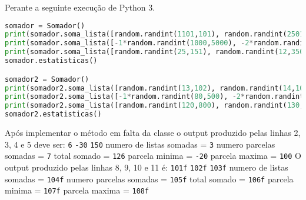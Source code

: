 \documentclass[12pt,varwidth=16cm,border=17pt]{standalone}
\begin{document}
Perante a seguinte execução de Python 3. 

\begin{lstlisting}[language=Python]
somador = Somador()
print(somador.soma_lista([random.randint(1101,101), random.randint(2501,200), random.randint(3350,300)]))
print(somador.soma_lista([-1*random.randint(1000,5000), -2*random.randint(2000, 8000)]))
print(somador.soma_lista([random.randint(25,151), random.randint(12,350)]))
somador.estatisticas()

somador2 = Somador()
print(somador2.soma_lista([random.randint(13,102), random.randint(14,103)]))
print(somador2.soma_lista([-1*random.randint(80,500), -2*random.randint(90, 600), -3*random.randint(110,700)]))
print(somador2.soma_lista([random.randint(120,800), random.randint(130,900), random.randint(140,1001), random.randint(160,1002)]))
somador2.estatisticas()
\end{lstlisting}


Após implementar o método em falta da classe o output produzido pelas linhas 2, 3, 4 e 5 deve ser:
\newline 
\verb+6+\newline
\verb+-30+\newline
\verb+150+\newline
numero de listas somadas = \verb+3+\newline
numero parcelas somadas  = \verb+7+\newline
total somado             = \verb+126+\newline
parcela minima           = \verb+-20+\newline
parcela maxima           = \verb+100+\newline
\newline
\newline
O output produzido pelas linhas 8, 9, 10 e 11 é:
\newline
\verb+101f+\newline
\verb+102f+\newline
\verb+103f+\newline
numero de listas somadas = \verb+104f+\newline
numero parcelas somadas  = \verb+105f+\newline
total somado             = \verb+106f+\newline
parcela minima           = \verb+107f+\newline
parcela maxima           = \verb+108f+\newline
\end{document}
